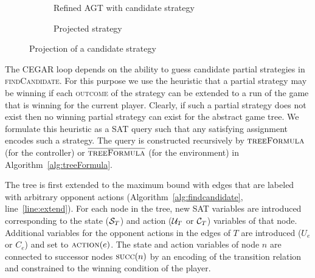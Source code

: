 \begin{figure}
\begin{subfigure}[t]{0.3\textwidth}
        \captionsetup{justification=centering}
        \caption{Refined AGT with candidate strategy}
    \end{subfigure}%
    \begin{subfigure}[t]{0.3\textwidth}
        \centering
        \begin{minipage}[t][3.9cm][t]{\textwidth}
        \centering
        \end{minipage}
        \caption{Projected strategy}
    \end{subfigure}%
    \caption{Projection of a candidate strategy}
    \label{fig:projection}
\end{figure}

The CEGAR loop depends on the ability to guess candidate partial strategies in \textsc{findCandidate}. For this purpose we use the heuristic that a partial strategy may be winning if each \textsc{outcome} of the strategy can be extended to a run of the game that is winning for the current player.  Clearly, if such a partial strategy does not exist then no winning partial strategy can exist for the abstract game tree. We formulate this heuristic as a SAT query such that any satisfying assignment encodes such a strategy. The query is constructed recursively by $\textsc{treeFormula}$ (for the controller) or $\textsc{$\overline{\mbox{treeFormula}}$}$ (for the environment) in Algorithm~\ref{alg:treeFormula}.  

The tree is first extended to the maximum bound with edges that are labeled with arbitrary opponent actions (Algorithm~\ref{alg:findcandidate}, line~\ref{line:extend}).  For each node in the tree, new SAT variables are introduced corresponding to the state ($\mathcal{S}_T$) and action ($\mathcal{U}_T$ or $\mathcal{C}_T$) variables of that node. Additional variables for the opponent actions in the edges of $T$ are introduced ($U_e$ or $C_e$) and set to $\textsc{action}(e)$.  The state and action variables of node $n$ are connected to successor nodes $\textsc{succ}(n)$ by an encoding of the transition relation and constrained to the winning condition of the player.  

